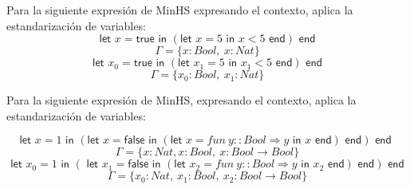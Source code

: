 \begin{exercise}    
    Para la siguiente expresión de \textsf{MinHS} expresando el contexto, aplica la estandarización de variables:
    $$ \textsf{let } x = \textsf{true} \textsf{ in } (\textsf{let } x = 5 \textsf{ in } x < 5 \textsf{ end}) \textsf{ end} $$
    $$ \Gamma = \{x:Bool,\ x:Nat\}$$
    $$ \textsf{let } x_0 = \textsf{true} \textsf{ in }  (\textsf{let } x_1 = 5 \textsf{ in } x_1 < 5 \textsf{ end}) \textsf{ end} $$
    $$ \Gamma = \{x_0:Bool,\ x_1:Nat\}$$
\end{exercise}

\begin{exercise}    
    Para la siguiente expresión de \textsf{MinHS}, expresando el contexto, aplica la estandarización de variables:
    
    $$ \textsf{let } x = 1 \textsf{ in } (\textsf{let } x = \textsf{false} \textsf{ in } (\textsf{let } x = fun\ y :: Bool \Rightarrow y  \textsf{ in } x \textsf{ end}) \textsf{ end}) \textsf{ end }$$
    $$ \Gamma = \{ x : Nat, x : Bool,\ x : Bool \to Bool \}$$
    $$ \textsf{let } x_0 = 1 \textsf{ in } (\textsf{ let } x_1 = \textsf{false} \textsf{ in } (\textsf{let } x_2 = fun\ y :: Bool \Rightarrow y \textsf{ in } x_2 \textsf{ end}) \textsf{ end}) \textsf{ end} $$
    $$ \Gamma = \{ x_0 : Nat,\ x_1 : Bool,\ x_2 : Bool \to Bool \}$$
\end{exercise}

